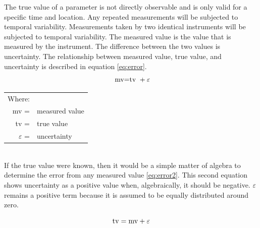 \begin{linenumbers}
The true value of a parameter is not directly observable and is only valid for a specific time and location.  Any repeated measurements will be subjected to temporal variability.  Measurements taken by two identical instruments will be subjected to temporal variability.  The measured value is the value that is measured by the instrument.  The difference between the two values is uncertainty.  The relationship between measured value, true value, and uncertainty is described in equation \ref{eq:error}.
\begin{equation}
\label{eq:error}
\textnormal{ mv=tv } + \varepsilon
\end{equation}
\begin{tabularx}{6in}{r X}
Where:&\\
mv = & measured value\\
tv = & true value\\
$\varepsilon$ = & uncertainty\\
\end{tabularx}\\

If the true value were known, then it would be a simple matter of algebra to determine the error from any measured value \ref{eq:error2}.  This second equation shows uncertainty as a positive value when, algebraically, it should be negative.  $ \varepsilon $ remains a positive term because it is assumed to be equally distributed around zero.

\begin{equation}
\label{eq:error2}
\textnormal{tv} = \textnormal{mv} + \varepsilon
\end{equation}


\end{linenumbers}
